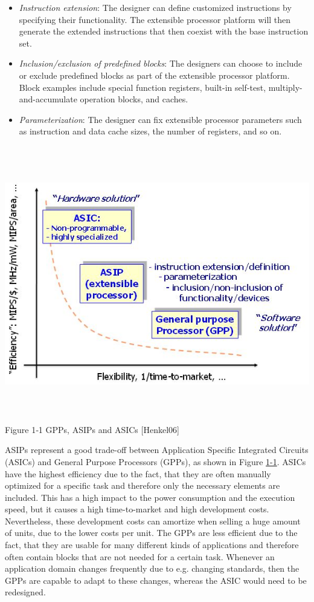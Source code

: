 \documentclass[
]{article}
\begin{document}
\begin{itemize}
\item
  \emph{Instruction extension}: The designer can define customized
  instructions by specifying their functionality. The extensible
  processor platform will then generate the extended instructions that
  then coexist with the base instruction set.
\item
  \emph{Inclusion/exclusion of predefined blocks}: The designers can
  choose to include or exclude predefined blocks as part of the
  extensible processor platform. Block examples include special function
  registers, built-in self-test, multiply-and-accumulate operation
  blocks, and caches.
\item
  \emph{Parameterization}: The designer can fix extensible processor
  parameters such as instruction and data cache sizes, the number of
  registers, and so on.
\end{itemize}
\includegraphics[width=5.86597in,height=4.73125in]{1-1.png}
Figure 1‑1\protect\hypertarget{Fig11}{}{} GPPs, ASIPs and ASICs
{[}Henkel06{]}

ASIPs represent a good trade-off between Application Specific Integrated
Circuits (ASICs) and General Purpose Processors (GPPs), as shown in
Figure \protect\hyperlink{Fig11}{1-1}. ASICs have the highest efficiency
due to the fact, that they are often manually optimized for a specific
task and therefore only the necessary elements are included. This has a
high impact to the power consumption and the execution speed, but it
causes a high time-to-market and high development costs. Nevertheless,
these development costs can amortize when selling a huge amount of
units, due to the lower costs per unit. The GPPs are less efficient due
to the fact, that they are usable for many different kinds of
applications and therefore often contain blocks that are not needed for
a certain task. Whenever an application domain changes frequently due to
e.g. changing standards, then the GPPs are capable to adapt to these
changes, whereas the ASIC would need to be redesigned.
\end{document}
